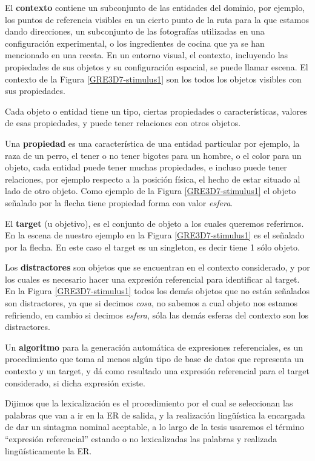 El {\bf contexto} contiene un subconjunto de las entidades del dominio, por ejemplo, los puntos de referencia visibles en un cierto punto de la ruta para la que estamos dando direcciones, un subconjunto de las fotograf\'ias utilizadas en una configuraci\'on experimental, o los ingredientes de cocina que ya se han mencionado en una receta. En un entorno visual, el contexto, incluyendo las propiedades de sus objetos y su configuraci\'on espacial, se puede llamar escena. El contexto de la Figura \ref{GRE3D7-stimulus1} son los todos los objetos visibles con sus propiedades.

Cada objeto o entidad tiene un tipo, ciertas propiedades o caracter\'isticas, valores de esas propiedades, y puede tener relaciones con otros objetos.

Una {\bf propiedad} es una caracter\'istica de una entidad particular por ejemplo, la raza de un perro, el tener o no tener bigotes para un hombre, o el color para un objeto, cada entidad puede tener muchas propiedades, e incluso puede tener relaciones, por ejemplo respecto a la posici\'on f\'isica, el hecho de estar situado al lado de otro objeto. Como ejemplo de la Figura \ref{GRE3D7-stimulus1} el objeto se\~nalado por la flecha tiene propiedad forma con valor {\it esfera}.

El {\bf target} (u objetivo), es el conjunto de objeto a los cuales queremos referirnos. En la escena de nuestro ejemplo en la Figura \ref{GRE3D7-stimulus1} es el se\~nalado por la flecha. En este caso el target es un singleton, es decir tiene 1 s\'olo objeto.

Los {\bf distractores} son objetos que se encuentran en el contexto considerado, y por los cuales es necesario hacer una expresi\'on referencial para identificar al target. En la Figura \ref{GRE3D7-stimulus1} todos los dem\'as objetos que no est\'an se\~nalados son distractores, ya que si decimos {\it cosa}, no sabemos a cual objeto nos estamos refiriendo, en cambio si decimos {\it esfera}, s\'ola las dem\'as esferas del contexto son los distractores.

Un {\bf algoritmo} para la generaci\'on autom\'atica de expresiones referenciales, es un procedimiento que toma al menos alg\'un tipo de base de datos que representa un contexto y un target, y d\'a como resultado una expresi\'on referencial para el target considerado, si dicha expresi\'on existe.

Dijimos que la lexicalizaci\'on es el procedimiento por el cual se seleccionan las palabras que van a ir en la ER de salida, y la realizaci\'on ling\"u\'istica la encargada de dar un sintagma nominal aceptable, a lo largo de la tesis usaremos el t\'ermino ``expresi\'on referencial'' estando o no lexicalizadas las palabras y realizada ling\"u\'isticamente la ER.

